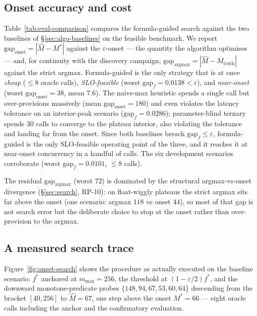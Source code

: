 \subsection{Onset accuracy and cost}
\label{sec:exp-accuracy}
Table~\ref{tab:eval-comparison} compares the formula-guided search against the two baselines of
\S\ref{sec:algo-baselines} on the feasible benchmark. We report $\mathrm{gap}_{\mathrm{onset}}
=|\hat M - M^\ast|$ against the $\varepsilon$-onset --- the quantity the algorithm optimises ---
and, for continuity with the discovery campaign, $\mathrm{gap}_{\mathrm{argmax}}=|\hat M -
M_{\mathrm{truth}}|$ against the strict argmax. Formula-guided is the only strategy that is at
once \emph{cheap} ($\le 8$ oracle calls), \emph{SLO-feasible} (worst $\mathrm{gap}_f=0.0138<
\varepsilon$), and \emph{near-onset} (worst $\mathrm{gap}_{\mathrm{onset}}=38$, mean $7.6$). The
naive-max heuristic spends a single call but over-provisions massively (mean
$\mathrm{gap}_{\mathrm{onset}}=180$) and even violates the latency tolerance on an interior-peak
scenario ($\mathrm{gap}_f=0.0286$); parameter-blind ternary spends $30$ calls to converge to the
plateau interior, also violating the tolerance and landing far from the onset. Since both
baselines breach $\mathrm{gap}_f\le\varepsilon$, formula-guided is the only SLO-feasible
operating point of the three, and it reaches it at near-onset concurrency in a handful of
calls. The six development scenarios corroborate (worst
$\mathrm{gap}_f=0.0101$, $\le 8$ calls).



The residual $\mathrm{gap}_{\mathrm{argmax}}$ (worst $72$) is dominated by the structural
argmax-vs-onset divergence (\S\ref{sec:search}, RP-10): on float-wiggly plateaus the strict
argmax sits far above the onset (one scenario: argmax $118$ vs onset $44$), so most of that gap
is not search error but the deliberate choice to stop at the onset rather than over-provision to
the argmax.

\subsection{A measured search trace}
\label{sec:exp-trace}
Figure~\ref{fig:onset-search} shows the procedure as actually executed on the baseline scenario:
$f^\ast$ anchored at $m_{\max}=256$, the threshold at $(1-\varepsilon/2)f^\ast$, and the
downward monotone-predicate probes $\{148,94,67,53,60,64\}$ descending from the bracket
$[40,256]$ to $\hat M=67$, one step above the onset $M^\ast=66$ --- eight oracle calls including
the anchor and the confirmatory evaluation.


